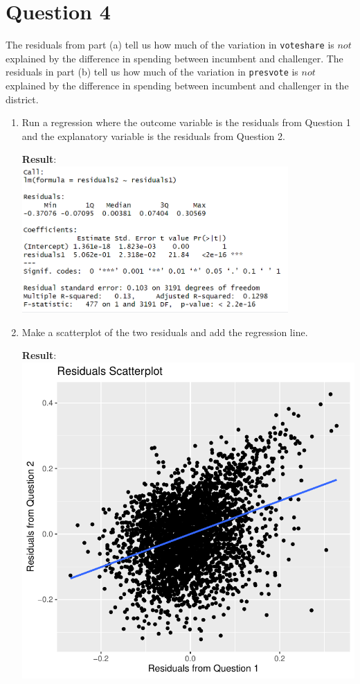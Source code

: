 \documentclass[12pt,letterpaper]{article}
\begin{document}
\newpage	
\section*{Question 4}
\noindent The residuals from part (a) tell us how much of the variation in \texttt{voteshare} is $not$ explained by the difference in spending between incumbent and challenger. The residuals in part (b) tell us how much of the variation in \texttt{presvote} is $not$ explained by the difference in spending between incumbent and challenger in the district.
	\begin{enumerate}
		\item Run a regression where the outcome variable is the residuals from Question 1 and the explanatory variable is the residuals from Question 2.	
			\vspace{.25cm}
			 
			\textbf{Result}:\\
			\includegraphics[width=0.8\textwidth]{plot_4a.png}
			\vspace{.25cm}
		\item Make a scatterplot of the two residuals and add the regression line. 	
			\vspace{.25cm}
			 
			\textbf{Result}:\\
			\includegraphics[width=.85\textwidth]{plot_4b.pdf} 

\end{enumerate}
\end{document}
